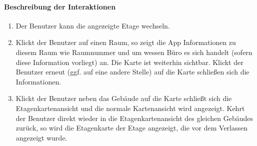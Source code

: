 \paragraph{Beschreibung der Interaktionen}
\begin{enumerate}[start=22, label=\textbf{/FA\arabic*/}, align=left]
    \item Der \Gls{Benutzer} kann die angezeigte Etage wechseln.
    \item Klickt der \Gls{Benutzer} auf einen Raum, so zeigt die App Informationen zu diesem Raum wie Raumnummer und um wessen Büro es sich handelt (sofern diese Information vorliegt) an. Die \Gls{Karte} ist weiterhin sichtbar. Klickt der \Gls{Benutzer} erneut (ggf. auf eine andere Stelle) auf die \Gls{Karte} schließen sich die Informationen.
    \item Klickt der \Gls{Benutzer} neben das Gebäude auf die \Gls{Karte} schließt sich die \Gls{Etagenkartenansicht} und die normale \Gls{Kartenansicht} wird angezeigt. Kehrt der \Gls{Benutzer} direkt wieder in die \Gls{Etagenkartenansicht} des gleichen Gebäudes zurück, so wird die \Gls{Etagenkarte} der Etage angezeigt, die vor dem Verlassen angezeigt wurde.
\end{enumerate}